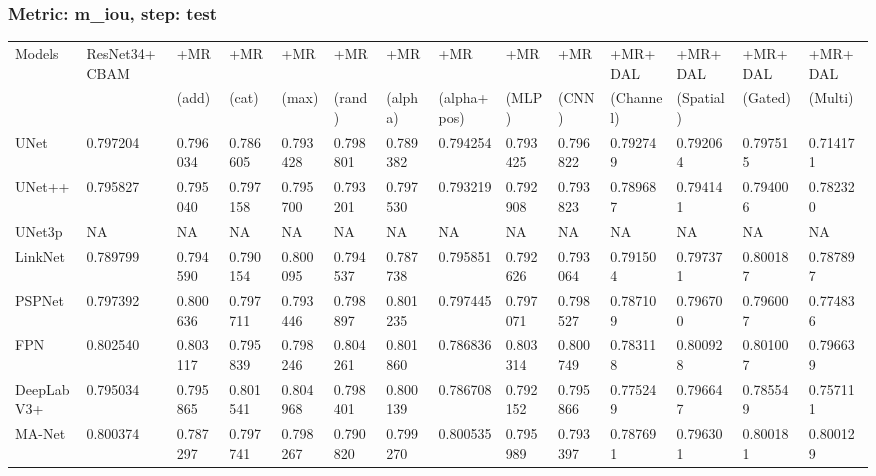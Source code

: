 \documentclass{article}
\begin{document}
\subsubsection{Metric: m\_iou, step: test}
\begin{tabular}{llllllllllllll}
\toprule
Models & ResNet34+CBAM & +MR  & +MR  & +MR  & +MR  & +MR  & +MR  & +MR  & +MR  & +MR+DAL & +MR+DAL & +MR+DAL & +MR+DAL \\
       &             &  (add) &  (cat) &  (max) &  (rand) &  (alpha) &  (alpha+pos) &  (MLP) &  (CNN) & (Channel) & (Spatial) & (Gated) & (Multi) \\
\midrule
UNet & 0.797204 & 0.796034 & 0.786605 & 0.793428 & 0.798801 & 0.789382 & 0.794254 & 0.793425 & 0.796822 & 0.792749 & 0.792064 & 0.797515 & 0.714171 \\
UNet++ & 0.795827 & 0.795040 & 0.797158 & 0.795700 & 0.793201 & 0.797530 & 0.793219 & 0.792908 & 0.793823 & 0.789687 & 0.794141 & 0.794006 & 0.782320 \\
UNet3p & NA & NA & NA & NA & NA & NA & NA & NA & NA & NA & NA & NA & NA \\
LinkNet & 0.789799 & 0.794590 & 0.790154 & 0.800095 & 0.794537 & 0.787738 & 0.795851 & 0.792626 & 0.793064 & 0.791504 & 0.797371 & 0.800187 & 0.787897 \\
PSPNet & 0.797392 & 0.800636 & 0.797711 & 0.793446 & 0.798897 & 0.801235 & 0.797445 & 0.797071 & 0.798527 & 0.787109 & 0.796700 & 0.796007 & 0.774836 \\
FPN & 0.802540 & 0.803117 & 0.795839 & 0.798246 & 0.804261 & 0.801860 & 0.786836 & 0.803314 & 0.800749 & 0.783118 & 0.800928 & 0.801007 & 0.796639 \\
DeepLabV3+ & 0.795034 & 0.795865 & 0.801541 & 0.804968 & 0.798401 & 0.800139 & 0.786708 & 0.792152 & 0.795866 & 0.775249 & 0.796647 & 0.785549 & 0.757111 \\
MA-Net & 0.800374 & 0.787297 & 0.797741 & 0.798267 & 0.790820 & 0.799270 & 0.800535 & 0.795989 & 0.793397 & 0.787691 & 0.796301 & 0.800181 & 0.800129 \\
\bottomrule
\end{tabular}
\end{document}
